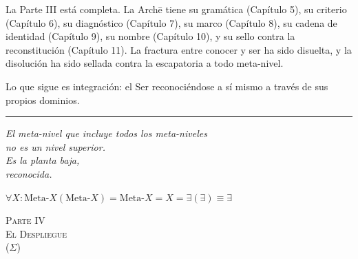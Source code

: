 \documentclass[10pt, openany, oneside]{book}
\renewcommand{\normalsize}{\fontsize{10}{13}\selectfont}
\renewcommand{\large}{\fontsize{11.5}{14}\selectfont}
\renewcommand{\LARGE}{\fontsize{15}{18}\selectfont}
\begin{document}
\vspace{2em}

La Parte III está completa. La Arch\={e} tiene su gramática (Capítulo 5), su criterio (Capítulo 6), su diagnóstico (Capítulo 7), su marco (Capítulo 8), su cadena de identidad (Capítulo 9), su nombre (Capítulo 10), y su sello contra la reconstitución (Capítulo 11). La fractura entre conocer y ser ha sido disuelta, y la disolución ha sido sellada contra la escapatoria a todo meta-nivel.

Lo que sigue es integración: el Ser reconociéndose a sí mismo a través de sus propios dominios.

\vspace{2em}

\begin{center}
    \rule{0.15\textwidth}{0.3pt}
\end{center}

\vspace{0.5em}

\begin{center}
    \itshape
    El meta-nivel que incluye todos los meta-niveles\\
    no es un nivel superior.\\[0.8em]
    Es la planta baja,\\
    reconocida.
\end{center}

\vspace{0.5em}

\begin{center}
    $\forall X: \text{Meta-}X(\text{Meta-}X) = \text{Meta-}X = X = \exists(\exists) \equiv \exists$
\end{center}

%
%

\newpage
\thispagestyle{empty}
\vspace*{\fill}
\begin{center}
    {\LARGE\scshape Parte IV}\\[1em]
    {\large\scshape El Despliegue}\\[0.5em]
    {\normalsize ($\Sigma$)}
\end{center}
\vspace*{\fill}
\newpage
\end{document}
